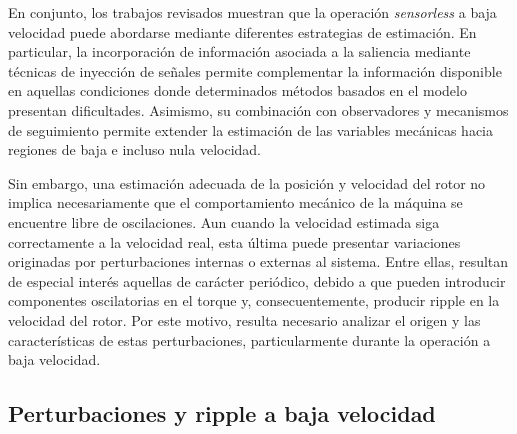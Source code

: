 %
%
%
%
%
%
%
%
%
%
%
%
%
%
%
%
En conjunto, los trabajos revisados muestran que la operación \textit{sensorless} a baja velocidad puede abordarse mediante diferentes estrategias de estimación. En particular, la incorporación de información asociada a la saliencia mediante técnicas de inyección de señales permite complementar la información disponible en aquellas condiciones donde determinados métodos basados en el modelo presentan dificultades. Asimismo, su combinación con observadores y mecanismos de seguimiento permite extender la estimación de las variables mecánicas hacia regiones de baja e incluso nula velocidad.

Sin embargo, una estimación adecuada de la posición y velocidad del rotor no implica necesariamente que el comportamiento mecánico de la máquina se encuentre libre de oscilaciones. Aun cuando la velocidad estimada siga correctamente a la velocidad real, esta última puede presentar variaciones originadas por perturbaciones internas o externas al sistema. Entre ellas, resultan de especial interés aquellas de carácter periódico, debido a que pueden introducir componentes oscilatorias en el torque y, consecuentemente, producir ripple en la velocidad del rotor. Por este motivo, resulta necesario analizar el origen y las características de estas perturbaciones, particularmente durante la operación a baja velocidad.

\subsection{Perturbaciones y ripple a baja velocidad}

